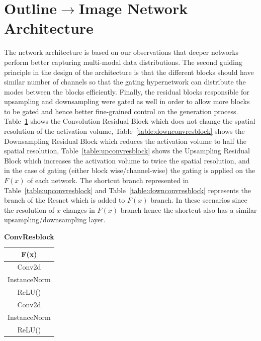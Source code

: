 \documentclass[10pt,twocolumn,letterpaper]{article}
\def\tabref#1{Table~\ref{#1}}
\begin{document}
\section{Outline$\rightarrow$Image Network Architecture}
The network architecture is based on our observations that deeper networks perform better capturing multi-modal data distributions. The second guiding principle in the design of the architecture is that the different blocks should have similar number of channels so that the gating hypernetwork can distribute the modes between the blocks efficiently. Finally, the residual blocks responsible for upsampling and downsampling were gated as well in order to allow more blocks to be gated and hence better fine-grained control on the generation process. 
\tabref{table:convresblock} shows the Convolution Residual Block which does not change the spatial resolution of the activation volume, 
\tabref{table:downconvresblock} shows the Downsampling Residual Block which reduces the activation volume to half the spatial resolution, 
\tabref{table:upconvresblock} shows the Upsampling Residual Block which increases the activation volume to twice the spatial resolution,  and in the case of gating (either block wise/channel-wise) the gating is applied on the $F(x)$ of each network. 
The shortcut branch represented in \tabref{table:upconvresblock} and \tabref{table:downconvresblock} represents the branch of the Resnet which is added to $F(x)$ branch. In these scenarios since the resolution of $x$ changes in $F(x)$ branch hence the shortcut also has a similar upsampling/downsampling layer.


\begin{table}[ht]
    \makegapedcells
        \centering %
        \begin{tabular}{c} %
        \toprule
        \textbf{F(x)}\\%
        \midrule
        Conv2d \\
        InstanceNorm\\ %
        ReLU() \\
        Conv2d \\
        InstanceNorm\\ %
        ReLU() \\
        \bottomrule %
        \end{tabular}
        \caption{\textbf{ConvResblock}} %
        \label{table:convresblock} %
\end{table}
\end{document}

